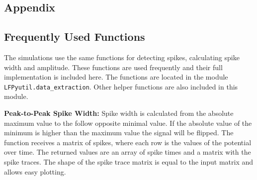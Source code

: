 \documentclass[altfont, fleqn]{uiophd}
\begin{document}
\begin{appendices}
\chapter{Appendix}
\startcontents
{}
\section{Frequently Used Functions}
\label{sec:frequent_functions}
The simulations use the same functions for 
detecting spikes, 
calculating spike
width and amplitude. 
These functions are used frequently and 
their full implementation is included here. 
The functions are located in the module 
\verb+LFPyutil.data_extraction+.
Other helper functions are also included in this module.
\newline

\noindent
\textbf{Peak-to-Peak Spike Width:}
Spike width is calculated from the absolute maximum value to
the follow opposite minimal value. 
If the absolute value of the minimum is higher than the maximum
value the signal will be flipped. 
The function receives a matrix of spikes, 
where each row is the values of the potential
over time. 
The returned values are an array of spike times
and a matrix with the spike traces. 
The shape of the spike trace matrix is
equal to the input matrix and allows easy plotting. 
\newline


\end{appendices}
\end{document}
